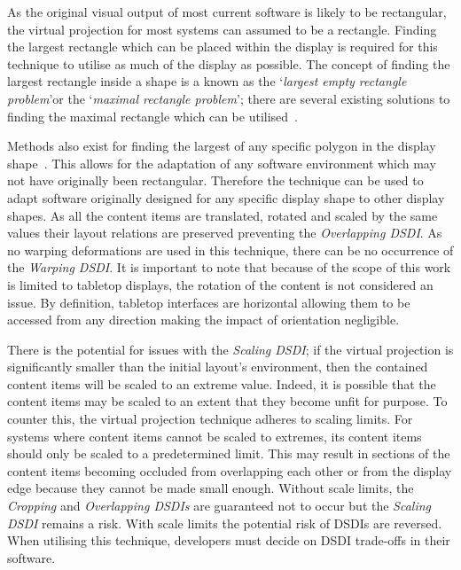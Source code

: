 \documentclass[twocolumn,compsoc]{cvm}
\begin{document}
As the original visual output of most current software is likely to be rectangular, the virtual projection for most systems can assumed to be a rectangle.
Finding the largest rectangle which can be placed within the display is required for this technique to utilise as much of the display as possible.
The concept of finding the largest rectangle inside a shape is a known as the \lq {\emph{largest empty rectangle problem}}\rq or the \lq {\emph{maximal rectangle problem}}\rq; there are several existing solutions to finding the maximal rectangle which can be utilised~\cite{Aggarwal1987,Naamad1984}.

Methods also exist for finding the largest of any specific polygon in the display shape~\cite{Toussaint1983}.
This allows for the adaptation of any software environment which may not have originally been rectangular.
Therefore the technique can be used to adapt software originally designed for any specific display shape to other display shapes.
As all the content items are translated, rotated and scaled by the same values their layout relations are preserved preventing the {\emph{Overlapping \ac{DSDI}}}.
As no warping deformations are used in this technique, there can be no occurrence of the {\emph{Warping \ac{DSDI}}}.
It is important to note that because of the scope of this work is limited to tabletop displays, the rotation of the content is not considered an issue.
By definition, tabletop interfaces are horizontal allowing them to be accessed from any direction making the impact of orientation negligible.

There is the potential for issues with the {\emph{Scaling \ac{DSDI}}}; if the virtual projection is significantly smaller than the initial
layout's environment, then the contained content items will be scaled to an extreme value.
Indeed, it is possible that the content items may be scaled to an extent that they become unfit for purpose.
To counter this, the virtual projection technique adheres to scaling limits.
For systems where content items cannot be scaled to extremes, its content items should only be scaled to a predetermined limit.
This may result in sections of the content items becoming occluded from overlapping each other or from the display edge because they cannot be made small enough.
Without scale limits, the {\emph{Cropping}} and {\emph{Overlapping \acp{DSDI}}} are guaranteed not to occur but the {\emph{Scaling \ac{DSDI}}} remains a risk.
With scale limits the potential risk of \acp{DSDI} are reversed.
When utilising this technique, developers must decide on \ac{DSDI} trade-offs in their software.
\end{document}
